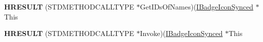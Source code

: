 \begin{DoxyCompactItemize}
\item 
\hypertarget{struct_i_badge_icon_synced_vtbl_af69323cd395a449b462112ee46ccd00e}{{\bfseries H\-R\-E\-S\-U\-L\-T} (S\-T\-D\-M\-E\-T\-H\-O\-D\-C\-A\-L\-L\-T\-Y\-P\-E $\ast$Get\-I\-Ds\-Of\-Names)(\hyperlink{interface_i_badge_icon_synced}{I\-Badge\-Icon\-Synced} $\ast$This}\label{struct_i_badge_icon_synced_vtbl_af69323cd395a449b462112ee46ccd00e}

\item 
\hypertarget{struct_i_badge_icon_synced_vtbl_a4b835135ae0d0fefd9af9de33519de03}{{\bfseries H\-R\-E\-S\-U\-L\-T} (S\-T\-D\-M\-E\-T\-H\-O\-D\-C\-A\-L\-L\-T\-Y\-P\-E $\ast$Invoke)(\hyperlink{interface_i_badge_icon_synced}{I\-Badge\-Icon\-Synced} $\ast$This}\label{struct_i_badge_icon_synced_vtbl_a4b835135ae0d0fefd9af9de33519de03}

\end{DoxyCompactItemize}
